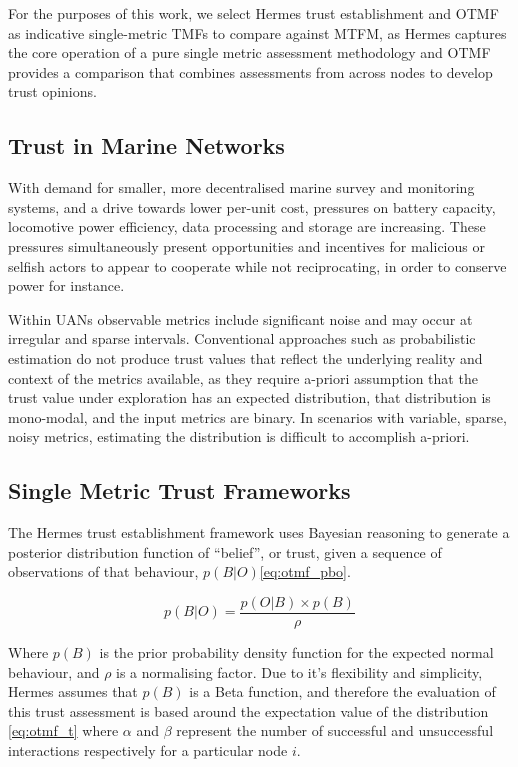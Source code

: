 For the purposes of this work, we select Hermes trust establishment and OTMF as indicative single-metric TMFs to compare against MTFM, as Hermes captures the core operation of a pure single metric assessment methodology and OTMF provides a comparison that combines assessments from across nodes to develop trust opinions.


\subsection{Trust in Marine Networks}\label{sec:trust_in_marine}

With demand for smaller, more decentralised marine survey and monitoring systems, and a drive towards lower per-unit cost, pressures on battery capacity, locomotive power efficiency, data processing and storage are increasing.
These pressures simultaneously present opportunities and incentives for malicious or selfish actors to appear to cooperate while not reciprocating, in order to conserve power for instance.

Within UANs observable metrics include significant noise and may occur at irregular and sparse intervals.
Conventional approaches such as probabilistic estimation do not produce trust values that reflect the underlying reality and context of the metrics available, as they require a-priori assumption that the trust value under exploration has an expected distribution, that distribution is mono-modal, and the input metrics are binary.
In scenarios with variable, sparse, noisy metrics, estimating the distribution is difficult to accomplish a-priori.

\subsection{Single Metric Trust Frameworks}

The Hermes trust establishment framework \cite{Zouridaki2005} uses Bayesian reasoning to generate a posterior distribution function of ``belief'', or trust, given a sequence of observations of that behaviour, $p(B|O)$\eqref{eq:otmf_pbo}.

\begin{equation}
	p(B|O)  = \frac{p(O|B) \times p(B)}{\rho}
	\label{eq:otmf_pbo}
\end{equation}

Where $p(B)$ is the prior probability density function for the expected normal behaviour, and $\rho$ is a normalising factor.
Due to it's flexibility and simplicity, Hermes assumes that $p(B)$ is a Beta function, and therefore the evaluation of this trust assessment is based around the expectation value of the distribution \eqref{eq:otmf_t}  where $\alpha$ and $\beta$ represent the number of successful and unsuccessful interactions respectively for a particular node $i$.

